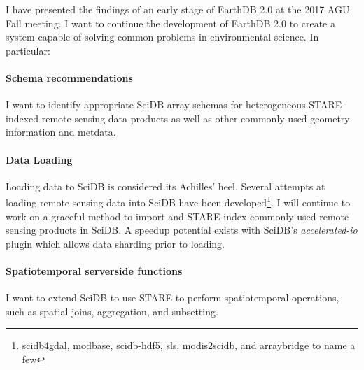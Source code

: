 \documentclass[letterpaper, parskip=half]{scrartcl}
\begin{document}
I have presented the findings of an early stage of EarthDB 2.0 at the 2017 \gls{AGU} Fall meeting. I want to continue the development of EarthDB 2.0 to create a system capable of solving common problems in environmental science. In particular:

\paragraph{Schema recommendations}
I want to identify appropriate SciDB array schemas for heterogeneous STARE-indexed remote-sensing data products as well as other commonly used geometry information and metdata.


\paragraph{Data Loading}
Loading data to SciDB is considered its Achilles' heel. Several attempts at loading remote sensing data into SciDB have been developed\footnote{scidb4gdal, modbase, scidb-hdf5, sls, modis2scidb, and arraybridge to name a few}. 
I will continue to work on a graceful method to import and STARE-index commonly used remote sensing products in SciDB. A speedup potential exists with SciDB's \textit{accelerated-io} plugin which allows data sharding prior to loading. 



\paragraph{Spatiotemporal serverside functions}
I want to extend SciDB to use STARE to perform spatiotemporal operations, such as spatial joins, aggregation, and subsetting.
\end{document}

